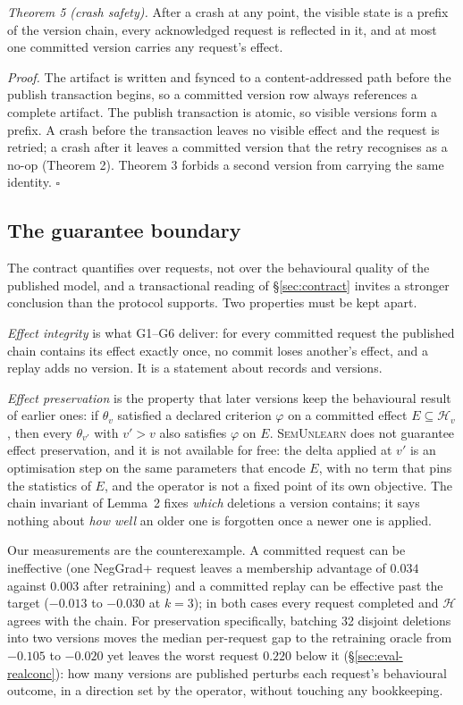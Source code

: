 \documentclass[conference]{IEEEtran}
\newcommand{\sys}{\textsc{SemUnlearn}}
\newcommand{\Hset}{\mathcal{H}}
\begin{document}
\emph{Theorem 5 (crash safety).} After a crash at any point, the visible state is a
prefix of the version chain, every acknowledged request is reflected in it, and at
most one committed version carries any request's effect.

\emph{Proof.} The artifact is written and fsynced to a content-addressed path before
the publish transaction begins, so a committed version row always references a
complete artifact.  The publish transaction is atomic, so visible versions form a
prefix.  A crash before the transaction leaves no visible effect and the request is
retried; a crash after it leaves a committed version that the retry recognises as a
no-op (Theorem 2).  Theorem 3 forbids a second version from carrying the same
identity. \hfill$\square$

\subsection{The guarantee boundary}
\label{sec:boundary}

The contract quantifies over requests, not over the behavioural quality of the published
model, and a transactional reading of \S\ref{sec:contract} invites a stronger conclusion
than the protocol supports.  Two properties must be kept apart.

\emph{Effect integrity} is what G1--G6 deliver: for every committed request the published
chain contains its effect exactly once, no commit loses another's effect, and a replay
adds no version.  It is a statement about records and versions.

\emph{Effect preservation} is the property that later versions keep the behavioural result
of earlier ones: if $\theta_v$ satisfied a declared criterion $\varphi$ on a committed
effect $E\subseteq\Hset_v$, then every $\theta_{v'}$ with $v'>v$ also satisfies
$\varphi$ on $E$.  \sys{} does not guarantee effect preservation, and it is not available
for free: the delta applied at $v'$ is an optimisation
step on the same parameters that encode $E$, with no term that pins the statistics of
$E$, and the operator is not a fixed point of its own objective.  The chain invariant of
Lemma~2 fixes \emph{which} deletions a version contains; it says nothing about
\emph{how well} an older one is forgotten once a newer one is applied.

Our measurements are the counterexample.  A committed request can be ineffective (one
NegGrad+ request leaves a membership advantage of $0.034$ against $0.003$ after
retraining) and a committed replay can be effective past the target ($-0.013$ to $-0.030$
at $k=3$); in both cases every request completed and $\Hset$ agrees with the chain.  For
preservation specifically, batching 32 disjoint deletions into two versions moves the
median per-request gap to the retraining oracle from $-0.105$ to $-0.020$ yet leaves the
worst request $0.220$ below it (\S\ref{sec:eval-realconc}): how many versions are
published perturbs each request's behavioural outcome, in a direction set by the operator,
without touching any bookkeeping.
\end{document}
